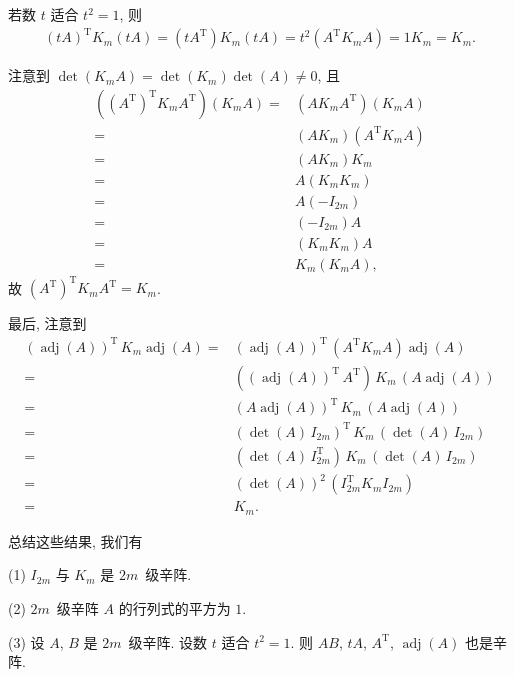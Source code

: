 若数 \(t\) 适合 \(t^2 = 1\),
则
\begin{align*}
    (t A)^{\mathrm{T}} K_m (t A)
    = (t A^{\mathrm{T}}) K_m (t A)
    = t^2 (A^{\mathrm{T}} K_m A)
    = 1 K_m = K_m.
\end{align*}

注意到
\(\det {(K_m A)} = \det {(K_m)} \det {(A)} \neq 0\),
且
\begin{align*}
    ((A^{\mathrm{T}})^{\mathrm{T}} K_m A^{\mathrm{T}})
    (K_m A)
    = {} &
    (A K_m A^{\mathrm{T}})
    (K_m A)
    \\
    = {} &
    (A K_m) (A^{\mathrm{T}} K_m A)
    \\
    = {} &
    (A K_m) K_m
    \\
    = {} &
    A (K_m K_m)
    \\
    = {} &
    A (-I_{2m})
    \\
    = {} &
    {(-I_{2m})} A
    \\
    = {} &
    (K_m K_m) A
    \\
    = {} &
    K_m (K_m A),
\end{align*}
故
\((A^{\mathrm{T}})^{\mathrm{T}} K_m A^{\mathrm{T}} = K_m\).

最后, 注意到
\begin{align*}
    (\operatorname{adj} {(A)})^{\mathrm{T}}\,
    K_m
    \operatorname{adj} {(A)}
    = {} &
    (\operatorname{adj} {(A)})^{\mathrm{T}}\,
    (A^{\mathrm{T}} K_m A)
    \operatorname{adj} {(A)}
    \\
    = {} &
    ((\operatorname{adj} {(A)})^{\mathrm{T}}\, A^{\mathrm{T}})\,
    K_m\,
    (A \operatorname{adj} {(A)})
    \\
    = {} &
    (A \operatorname{adj} {(A)})^{\mathrm{T}}\,
    K_m\,
    (A \operatorname{adj} {(A)})
    \\
    = {} &
    (\det {(A)}\, I_{2m})^{\mathrm{T}}\,
    K_m\,
    (\det {(A)}\, I_{2m})
    \\
    = {} &
    (\det {(A)}\, I_{2m}^{\mathrm{T}})\, K_m\,
    (\det {(A)}\, I_{2m})
    \\
    = {} &
    (\det {(A)})^2\, (I_{2m}^{\mathrm{T}} K_m I_{2m})
    \\
    = {} &
    K_m.
\end{align*}

总结这些结果, 我们有

\begin{theorem}
    (1)
    \(I_{2m}\) 与 \(K_m\) 是 \(2m\)~级辛阵.

    (2)
    \(2m\)~级辛阵 \(A\) 的行列式的平方为 \(1\).

    (3)
    设 \(A\), \(B\) 是 \(2m\)~级辛阵.
    设数 \(t\) 适合 \(t^2 = 1\).
    则 \(AB\), \(tA\),
    \(A^{\mathrm{T}}\),
    \(\operatorname{adj} {(A)}\)
    也是辛阵.
\end{theorem}

